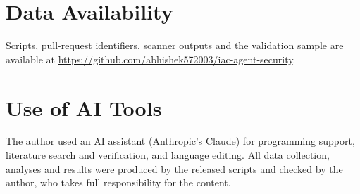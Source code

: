 \documentclass[10pt,conference]{IEEEtran}
\begin{document}
\section*{Data Availability}\label{sec:data}
Scripts, pull-request identifiers, scanner outputs and the validation sample are available at \url{https://github.com/abhishek572003/iac-agent-security}.

\section*{Use of AI Tools}
The author used an AI assistant (Anthropic's Claude) for programming support, literature search and verification, and language editing. All data collection, analyses and results were produced by the released scripts and checked by the author, who takes full responsibility for the content.



\end{document}
